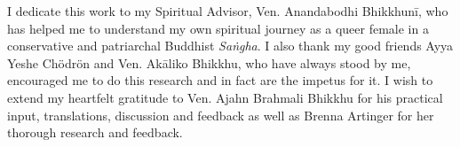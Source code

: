 \vspace{\fill}
\clearpage
\bigskip

\small I dedicate this work to my Spiritual Advisor, Ven. Anandabodhi Bhikkhunī, who has helped me to understand my own spiritual journey as a queer female in a conservative and patriarchal Buddhist {\em Saṅgha}. I also thank my good friends Ayya Yeshe Chödrön and Ven. Akāliko Bhikkhu, who have always stood by me, encouraged me to do this research and in fact are the impetus for it. I wish to extend my heartfelt gratitude to Ven. Ajahn Brahmali Bhikkhu for his practical input, translations, discussion and feedback as well as Brenna Artinger for her thorough research and feedback.
